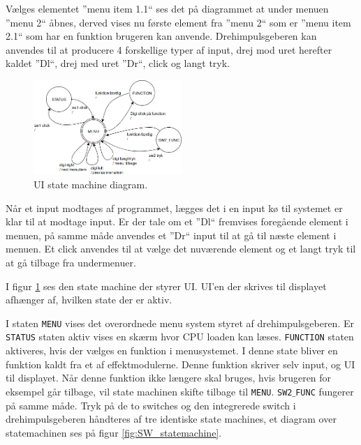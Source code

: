 Vælges elementet ''menu item 1.1`` ses det på diagrammet at under menuen ''menu 2`` åbnes, derved vises nu første element fra ''menu 2`` som er ''menu item 2.1`` som har en funktion brugeren kan anvende.
Drehimpulsgeberen kan anvendes til at producere 4 forskellige typer af input, drej mod uret herefter kaldet ''Dl``, drej med uret ''Dr``, click og langt tryk.


\begin{figure} 
	\centering 
	\includegraphics[width= 0.5\textwidth]{billeder/ui_statemachine.png} 
	\caption{UI state machine diagram. } 
	\label{fig:uistatemachine} 
\end{figure}

Når et input  modtages af programmet, lægges det i en input kø til systemet er klar til at modtage input.
Er der tale om et ''Dl`` fremvises foregående element i menuen, på samme måde anvendes et ''Dr`` input til at gå til næste element i menuen. 
Et click anvendes til at vælge det nuværende element og et langt tryk til at gå tilbage fra undermenuer.

I figur \ref{fig:uistatemachine} ses den state machine der styrer UI.
UI'en der skrives til displayet afhænger af, hvilken state der er aktiv.

I staten \texttt{MENU} vises det overordnede menu system styret af drehimpulsgeberen. 
Er \texttt{STATUS} staten aktiv vises en skærm hvor CPU loaden kan læses.
\texttt{FUNCTION} staten aktiveres, hvis der vælges en funktion i menusystemet. 
I denne state bliver en funktion kaldt fra et af effektmodulerne. 
Denne funktion skriver selv input, og UI til displayet.
Når denne funktion ikke længere skal bruges, hvis brugeren for eksempel går tilbage, vil state machinen skifte tilbage til \texttt{MENU}.
\texttt{SW2$\_$FUNC} fungerer på samme måde. \newline
Tryk på de to switches og den integrerede switch i drehimpulsgeberen håndteres af tre identiske state machines, et diagram over statemachinen ses på figur \ref{fig:SW_statemachine}.

